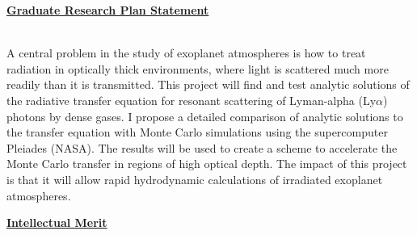 \documentclass[11pt]{article}
\title{\vspace{-1.5in}}
\author{}
\date{}
\begin{document}
\maketitle

\thispagestyle{empty}
\centerline{\underline{\textbf{Graduate Research Plan Statement}}}

\noindent
\\ A central problem in the study of exoplanet atmospheres is how to treat radiation in optically thick environments, where light is scattered much more readily than it is transmitted. This project will find and test analytic solutions of the radiative transfer equation for resonant scattering of Lyman-alpha (Ly$\alpha$) photons by dense gases. I propose a detailed comparison of analytic solutions to the transfer equation with Monte Carlo simulations using the supercomputer Pleiades (NASA). The results will be used to create a scheme to accelerate the Monte Carlo transfer in regions of high optical depth. The impact of this project is that it will allow rapid hydrodynamic calculations of irradiated exoplanet atmospheres.

\noindent \textbf{\underline{Intellectual Merit}} 
\end{document}
